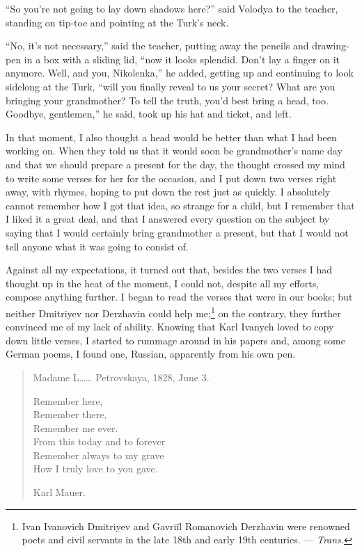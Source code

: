 ``So you're not going to lay down shadows here?'' said Volodya to the teacher, standing on tip-toe and pointing at the Turk's neck. %

``No, it's not necessary,'' said the teacher, putting away the pencils and drawing-pen in a box with a sliding lid, ``now it looks splendid. Don't lay a finger on it anymore. Well, and you, Nikolenka,'' he added, getting up and continuing to look sidelong at the Turk, ``will you finally reveal to us your secret? What are you bringing your grandmother? To tell the truth, you'd best bring a head, too. Goodbye, gentlemen,'' he said, took up his hat and ticket, and left.

In that moment, I also thought a head would be better than what I had been working on. When they told us that it would soon be grandmother's name day and that we should prepare a present for the day, the thought crossed my mind to write some verses for her for the occasion, and I put down two verses right away, with rhymes, hoping to put down the rest just as quickly. I absolutely cannot remember how I got that idea, so strange for a child, but I remember that I liked it a great deal, and that I answered every question on the subject by saying that I would certainly bring grandmother a present, but that I would not tell anyone what it was going to consist of.

Against all my expectations, it turned out that, besides the two verses I had thought up in the heat of the moment, I could not, despite all my efforts, compose anything further. I began to read the verses that were in our books; but neither Dmitriyev nor Derzhavin could help me;\footnote{Ivan Ivanovich Dmitriyev and Gavri\"il Romanovich Derzhavin were renowned poets and civil servants in the late 18th and early 19th centuries. --- \textit{Trans.}} on the contrary, they further convinced me of my lack of ability. Knowing that Karl Ivanych loved to copy down little verses, I started to rummage around in his papers and, among some German poems, I found one, Russian, apparently from his own pen.

\begin{verse}
Madame L\ldots{}\ldots{} Petrovskaya, 1828, June 3.

Remember here,\\
Remember there,\\
Remember me ever.\\
From this today and to forever\\
Remember always to my grave\\
How I truly love to you gave.

Karl Mauer.
\end{verse}

